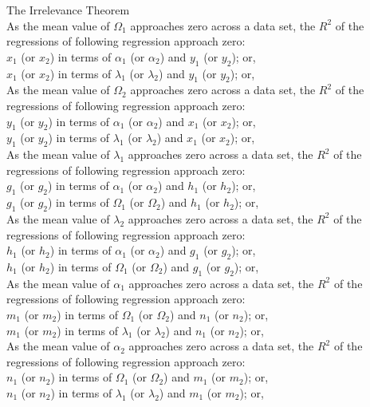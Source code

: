 \begin{corollary} The Irrelevance Theorem\\
As the mean value of $\Omega_{1}$ approaches zero across a data set, the $R^2$ of the regressions of following regression approach zero:\\
$x_{1}$ (or $x_{2}$) in terms of $\alpha_{1}$ (or $\alpha_{2}$) and $y_{1}$ (or $y_{2}$); or,\\
$x_{1}$ (or $x_{2}$) in terms of $\lambda_{1}$ (or $\lambda_{2}$) and $y_{1}$ (or $y_{2}$); or,\\

As the mean value of $\Omega_{2}$ approaches zero across a data set, the $R^2$ of the regressions of following regression approach zero:\\
$y_{1}$ (or $y_{2}$) in terms of $\alpha_{1}$ (or $\alpha_{2}$) and $x_{1}$ (or $x_{2}$); or,\\
$y_{1}$ (or $y_{2}$) in terms of $\lambda_{1}$ (or $\lambda_{2}$) and $x_{1}$ (or $x_{2}$); or,\\

As the mean value of $\lambda_{1}$ approaches zero across a data set, the $R^2$ of the regressions of following regression approach zero:\\
$g_{1}$ (or $g_{2}$) in terms of $\alpha_{1}$ (or $\alpha_{2}$) and $h_{1}$ (or $h_{2}$); or,\\
$g_{1}$ (or $g_{2}$) in terms of $\Omega_{1}$ (or $\Omega_{2}$) and $h_{1}$ (or $h_{2}$); or,\\

As the mean value of $\lambda_{2}$ approaches zero across a data set, the $R^2$ of the regressions of following regression approach zero:\\
$h_{1}$ (or $h_{2}$) in terms of $\alpha_{1}$ (or $\alpha_{2}$) and $g_{1}$ (or $g_{2}$); or,\\
$h_{1}$ (or $h_{2}$) in terms of $\Omega_{1}$ (or $\Omega_{2}$) and $g_{1}$ (or $g_{2}$); or,\\

As the mean value of $\alpha_{1}$ approaches zero across a data set, the $R^2$ of the regressions of following regression approach zero:\\
$m_{1}$ (or $m_{2}$) in terms of $\Omega_{1}$ (or $\Omega_{2}$) and $n_{1}$ (or $n_{2}$); or,\\
$m_{1}$ (or $m_{2}$) in terms of $\lambda_{1}$ (or $\lambda_{2}$) and $n_{1}$ (or $n_{2}$); or,\\

As the mean value of $\alpha_{2}$ approaches zero across a data set, the $R^2$ of the regressions of following regression approach zero:\\
$n_{1}$ (or $n_{2}$) in terms of $\Omega_{1}$ (or $\Omega_{2}$) and $m_{1}$ (or $m_{2}$); or,\\
$n_{1}$ (or $n_{2}$) in terms of $\lambda_{1}$ (or $\lambda_{2}$) and $m_{1}$ (or $m_{2}$); or,\\
\end{corollary}

